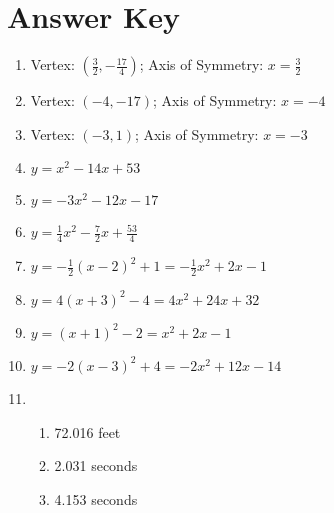 \newpage


\section{Answer Key}

\begin{enumerate}
	\item Vertex: $\left(\frac{3}{2}, -\frac{17}{4}\right)$; \quad Axis of Symmetry: $x = \frac{3}{2}$
    \item Vertex: $(-4,-17)$; \quad Axis of Symmetry: $x = -4$
    \item Vertex: $(-3,1)$; \quad Axis of Symmetry: $x = -3$
    
    \item $y = x^2 - 14x + 53$
    \item $y = -3x^2-12x-17$
    \item $y = \frac{1}{4}x^2-\frac{7}{2}x+\frac{53}{4}$
    
    \item $y = -\frac{1}{2}(x-2)^2+1 = -\frac{1}{2}x^2+2x-1$
    \item $y = 4(x+3)^2-4 = 4x^2+24x+32$
    \item $y =(x+1)^2-2 = x^2 + 2x - 1$
    \item $y = -2(x-3)^2 + 4 = -2x^2 + 12x - 14$
    
    \item 
    \begin{enumerate}
        \item 72.016 feet
        \item 2.031 seconds
        \item 4.153 seconds
    \end{enumerate}
\end{enumerate}
